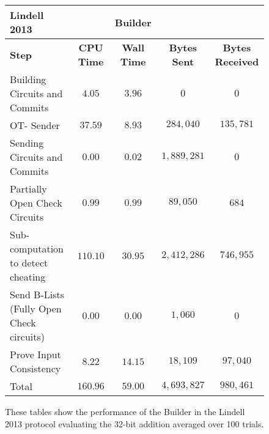 \documentclass[ %
                    author={Nicholas Tutte},
                supervisor={Prof. Nigel Smart},
                    degree={MEng},
                     title={Secure Two Party Computation},
                  subtitle={A practical comparison of recent protocols},
                      type={Research - GG1K},
                      year={2015} ]{dissertation}
\begin{document}
				\begin{figure}
					\begin{tabular}{| p{3.5cm} | c c c c |}
						\hline
						\textbf{Lindell 2013} & & \textbf{Builder} & & \\
						\hline
						\textbf{Step} & \textbf{CPU Time} & \textbf{Wall Time} & \textbf{Bytes Sent} & \textbf{Bytes Received} \\
						\thickhline
						Building Circuits and Commits & $4.05$ & $3.96$ & $0$ & $0$ \\
						\hline
						OT- Sender & $37.59$ & $8.93$ & $284,040$ & $135,781$ \\
						\hline
						Sending Circuits and Commits & $0.00$ & $0.02$ & $1,889,281$ & $0$ \\
						\hline
						Partially Open Check Circuits & $0.99$ & $0.99$ & $89,050$ & $684$ \\
						\hline
						Sub-computation to detect cheating & $110.10$ & $30.95$ & $2,412,286$ & $746,955$ \\
						\hline
						Send B-Lists (Fully Open Check circuits) & $0.00$ & $0.00$ & $1,060$ & $0$ \\ 
						\hline
						Prove Input Consistency & $8.22$ & $14.15$ & $18,109$ & $97,040$ \\
						\thickhline
						Total & $160.96$ & $59.00$ & $4,693,827$ & $980,461$ \\
						\hline
					\end{tabular}
					\caption{These tables show the performance of the Builder in the Lindell 2013 protocol evaluating the 32-bit addition averaged over 100 trials. \label{table:L_2013_Add_Builder}}
				\end{figure}
\end{document}
